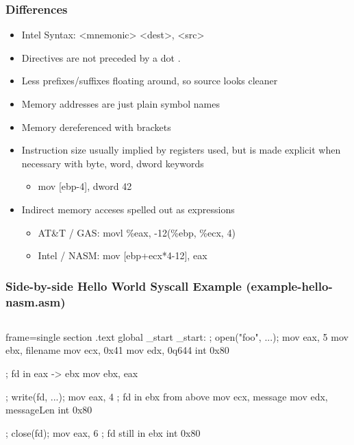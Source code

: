 \documentclass[11pt,xcolor=dvipsnames]{beamer}
\newcommand{\vs}{\vspace{0.5em}}
\newcommand{\mvs}{\vspace{-0.95em}}
\begin{document}
\begin{frame}[fragile,t]
\frametitle{Differences}
\begin{itemize}
  \item Intel Syntax: {\ttfamily <mnemonic> <dest>, <src>}
  \item Directives are not preceded by a dot {\ttfamily .}
  \item Less prefixes/suffixes floating around, so source looks cleaner
  \pause
  \item Memory addresses are just plain symbol names
  \item Memory dereferenced with brackets {\ttfamily [ ... ]}
  \pause
  \item Instruction size usually implied by registers used, but is made explicit when necessary with {\ttfamily byte, word, dword} keywords
  \begin{itemize}
    \item {\ttfamily mov [ebp-4], dword 42}
  \end{itemize}
  \vs
  \pause
  \item Indirect memory acceses spelled out as expressions
  \begin{itemize}
    \item AT\&T / GAS: {\ttfamily movl \%eax, -12(\%ebp, \%ecx, 4)}
    \item Intel / NASM: {\ttfamily mov [ebp+ecx*4-12], eax}
  \end{itemize}
\end{itemize}
\end{frame}

\begin{frame}[fragile,t]
\frametitle{Side-by-side Hello World Syscall Example (example-hello-nasm.asm)}
\mvs \mvs
\begin{columns}[T]
\begin{nasmcode*}{frame=single}
section .text
global _start
_start:
  ; open("foo", ...);
  mov eax, 5
  mov ebx, filename
  mov ecx, 0x41
  mov edx, 0q644
  int 0x80

  ; fd in eax -> ebx
  mov ebx, eax

  ; write(fd, ...);
  mov eax, 4
  ; fd in ebx from above
  mov ecx, message
  mov edx, messageLen
  int 0x80

  ; close(fd);
  mov eax, 6
  ; fd still in ebx
  int 0x80
\end{nasmcode*}
\end{columns}
\end{frame}
\end{document}
